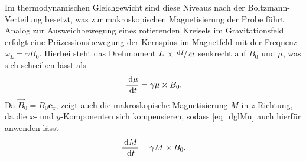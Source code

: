 \noindent 
Im thermodynamischen Gleichgewicht sind diese Niveaus nach der Boltzmann-Verteilung besetzt, was zur makroskopischen Magnetisierung der Probe führt. Analog
zur Ausweichbewegung eines rotierenden Kreisels im Gravitationsfeld erfolgt eine Präzessionsbewegung der Kernspins im Magnetfeld mit der Frequenz 
$\omega_L =\gamma B_0$. Hierbei steht das Drehmoment $L\propto \sfrac{\; \mathrm{d} I}{\; \mathrm{d} t}$ senkrecht auf $B_0$ und $\mu$, was sich schreiben lässt als 
\begin{align}
 \frac{\; \mathrm{d} \mu}{\; \mathrm{d} t} = \gamma \mu \times B_0.
 \label{eq_dglMu}
\end{align}
Da $\vec B_0 = B_0 \textbf{e}_z$, zeigt auch die makroskopische Magnetisierung $M$ in $z$-Richtung, da die $x$- und $y$-Komponenten sich kompensieren, sodass
\eqref{eq_dglMu} auch hierfür anwenden lässt
\begin{align}
 \frac{\; \mathrm{d} M}{\; \mathrm{d} t} = \gamma M \times B_0.
 \label{eq_dglMagnetisierung}
\end{align}

